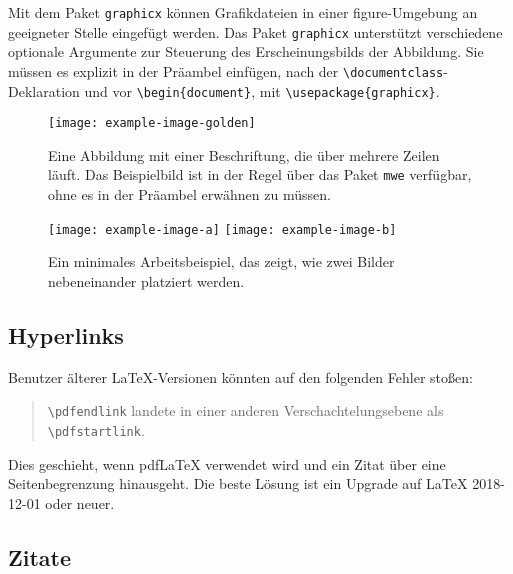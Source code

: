 \documentclass[11pt]{article}
\begin{document}
Mit dem Paket \verb|graphicx| können Grafikdateien in einer figure-Umgebung an geeigneter Stelle eingefügt werden.
Das Paket \verb|graphicx| unterstützt verschiedene optionale Argumente zur Steuerung des Erscheinungsbilds der Abbildung.
Sie müssen es explizit in der Präambel einfügen, nach der
\verb|\documentclass|-Deklaration und vor \verb|\begin{document}|, mit
\verb|\usepackage{graphicx}|.

\begin{figure}[t]
  \texttt{[image: example-image-golden]}
  \caption{Eine Abbildung mit einer Beschriftung, die über mehrere Zeilen läuft.
    Das Beispielbild ist in der Regel über das Paket \texttt{mwe} verfügbar,
    ohne es in der Präambel erwähnen zu müssen.}
  \label{fig:experiments}
\end{figure}

\begin{figure*}[t]
  \texttt{[image: example-image-a]} \hfill
  \texttt{[image: example-image-b]}
  \caption {Ein minimales Arbeitsbeispiel, das zeigt,
    wie zwei Bilder nebeneinander platziert werden.}
\end{figure*}

\subsection{Hyperlinks}

Benutzer älterer \LaTeX{}-Versionen könnten auf den folgenden Fehler stoßen:
\begin{quote}
\verb|\pdfendlink| landete in einer anderen Verschachtelungsebene als \verb|\pdfstartlink|.
\end{quote}
Dies geschieht, wenn pdf\LaTeX{} verwendet wird und ein Zitat über eine Seitenbegrenzung hinausgeht. Die beste Lösung ist ein Upgrade auf \LaTeX{} 2018-12-01 oder neuer.

\subsection{Zitate}
\end{document}
